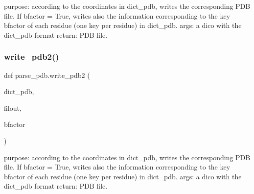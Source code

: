 \begin{DoxyVerb}purpose: according to the coordinates in dict_pdb, writes the
corresponding PDB file.
If bfactor = True, writes also the information corresponding to the key
bfactor of each residue (one key per residue) in dict_pdb.
args:
    a dico with the dict_pdb format
return:
    PDB file.
\end{DoxyVerb}
 \mbox{\label{namespaceparse__pdb_a11286d0c18b2f0468d7acf8db1ef028a}} 
\subsubsection{\texorpdfstring{write\+\_\+pdb2()}{write\_pdb2()}}
{\footnotesize\ttfamily def parse\+\_\+pdb.\+write\+\_\+pdb2 (\begin{DoxyParamCaption}\item[{}]{dict\+\_\+pdb,  }\item[{}]{filout,  }\item[{}]{bfactor }\end{DoxyParamCaption})}

\begin{DoxyVerb}purpose: according to the coordinates in dict_pdb, writes the
corresponding PDB file.
If bfactor = True, writes also the information corresponding to the key
bfactor of each residue (one key per residue) in dict_pdb.
args:
    a dico with the dict_pdb format
return:
    PDB file.
\end{DoxyVerb}
 